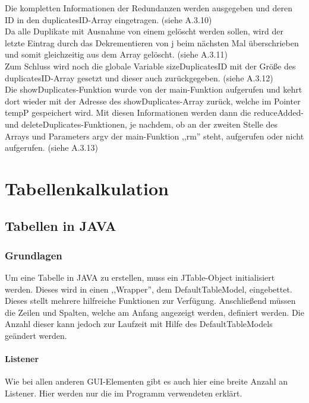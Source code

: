 \documentclass[12pt]{report}
\begin{document}
\noindent Die kompletten Informationen der Redundanzen werden ausgegeben und deren ID in den duplicatesID-Array eingetragen. (siehe A.3.10)\\

\noindent Da alle Duplikate mit Ausnahme von einem gelöscht werden sollen, wird der letzte Eintrag durch das Dekrementieren von j beim nächsten Mal überschrieben und somit gleichzeitig aus dem Array gelöscht. (siehe A.3.11)\\

\noindent Zum Schluss wird noch die globale Variable sizeDuplicatesID mit der Größe des duplicatesID-Array gesetzt und dieser auch zurückgegeben. (siehe A.3.12)\\

\noindent Die showDuplicates-Funktion wurde von der main-Funktion aufgerufen und kehrt dort wieder mit der Adresse des showDuplicates-Array zurück, welche im Pointer tempP gespeichert wird. Mit diesen Informationen werden dann die reduceAdded- und deleteDuplicates-Funktionen, je nachdem, ob an der zweiten Stelle des Arrays und Parameters argv der main-Funktion ,,rm'' steht, aufgerufen oder nicht aufgerufen. (siehe A.3.13)






\part{Tabellenkalkulation}

\chapter{Tabellen in JAVA}
\lhead{\thepage}

\section{Grundlagen}
Um eine Tabelle in JAVA zu erstellen, muss ein JTable-Object initialisiert werden. Dieses wird in einen ,,Wrapper'', dem DefaultTableModel, eingebettet. Dieses stellt mehrere hilfreiche Funktionen zur Verfügung. Anschließend müssen die Zeilen und Spalten, welche am Anfang angezeigt werden, definiert werden. Die Anzahl dieser kann jedoch zur Laufzeit mit Hilfe des DefaultTableModels geändert werden.

\subsection{Listener}
Wie bei allen anderen GUI-Elementen gibt es auch hier eine breite Anzahl an Listener. Hier werden nur die im Programm verwendeten erklärt.
\end{document}
